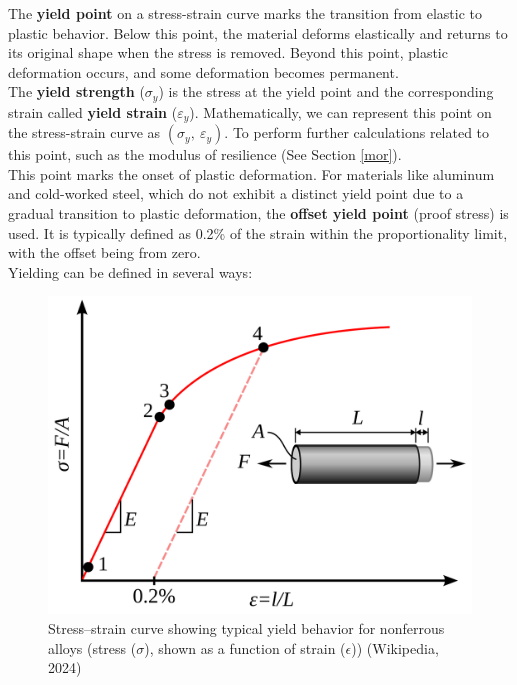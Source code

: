 \documentclass{article}
\begin{document}
 The \textbf{yield point} on a stress-strain curve marks the transition from elastic to plastic behavior. Below this point, the material deforms elastically and returns to its original shape when the stress is removed. Beyond this point, plastic deformation occurs, and some deformation becomes permanent.\\[8pt]
 The \textbf{yield strength} (\( \sigma_y \)) is the stress at the yield point and the corresponding strain called \textbf{yield strain} (\( \varepsilon_y \)). Mathematically, we can represent this point on the stress-strain curve as \( (\sigma_y,\ \varepsilon_y) \). To perform further calculations related to this point, such as the modulus of resilience (See Section \ref{mor}).\\[8pt]
This point marks the onset of plastic deformation. For materials like aluminum and cold-worked steel, which do not exhibit a distinct yield point due to a gradual transition to plastic deformation, the \textbf{offset yield point} (proof stress) is used. It is typically defined as 0.2\% of the strain within the proportionality limit, with the offset being from zero.\\[8pt] 
Yielding can be defined in several ways:\\
\begin{minipage}{0.4\textwidth}
     \begin{figure}[H]
     \centering
     \includegraphics[width=1\textwidth]{images/Metal_yield.png}
     \caption{Stress–strain curve showing typical yield behavior for nonferrous alloys (stress (\(\sigma\)), shown as a function of strain (\(\epsilon\))) (Wikipedia, 2024)}
     \label{fig:str}
 \end{figure} 
 \end{minipage}\hfil
\end{document}
